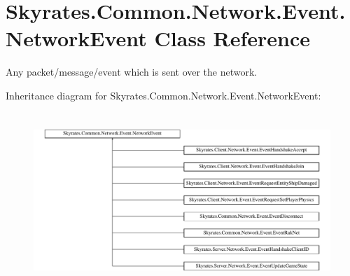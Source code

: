 \hypertarget{class_skyrates_1_1_common_1_1_network_1_1_event_1_1_network_event}{\section{Skyrates.\-Common.\-Network.\-Event.\-Network\-Event Class Reference}
\label{class_skyrates_1_1_common_1_1_network_1_1_event_1_1_network_event}
}


Any packet/message/event which is sent over the network.  


Inheritance diagram for Skyrates.\-Common.\-Network.\-Event.\-Network\-Event\-:\begin{figure}[H]
\begin{center}
\leavevmode
\includegraphics[height=6.631579cm]{class_skyrates_1_1_common_1_1_network_1_1_event_1_1_network_event}
\end{center}
\end{figure}
